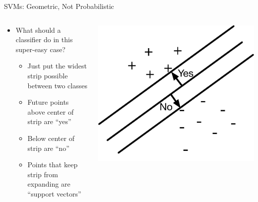 \documentclass[aspectratio=169]{beamer}
\begin{document}
\begin{frame}{SVMs: Geometric, Not Probabilistic}

\begin{columns}
\begin{column}{0.6\textwidth}
\begin{itemize}
\item What should a classifier do in this super-easy case?
\begin{itemize}
\item Just put the widest strip possible between two classes
\item Future points above center of strip are ``yes''
\item Below center of strip are ``no''
\item Points that keep strip from expanding are ``support vectors''
\end{itemize}
\end{itemize}
\end{column}
\begin{column}{0.4\textwidth}
\includegraphics[width=1\textwidth]{lectSVM/logRstrip.pdf}
\end{column}
\end{columns}
\end{frame}
\end{document}
